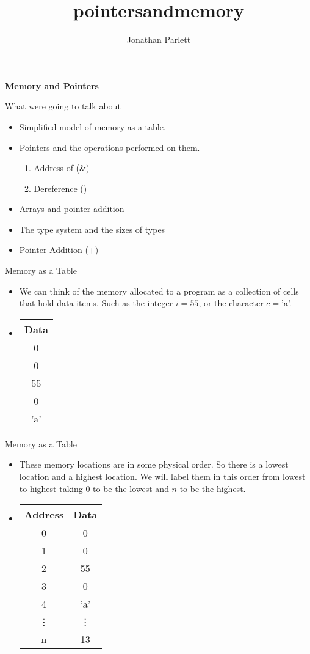 \documentclass[10pt]{beamer}
\title{pointersandmemory}
\author{Jonathan Parlett}
\begin{document}
\begin{frame}
    \titlepage
	{\bf Memory and Pointers}
\end{frame}


\begin{frame}{What were going to talk about}
	\begin{itemize}[<+->]
		\item Simplified model of memory as a table.
		\item Pointers and the operations performed on them.
		\begin{enumerate}[<+->]
			\item Address of (\&)
			\item Dereference (\*)
		\end{enumerate}
		\item Arrays and pointer addition
		\item The type system and the sizes of types
		\item Pointer Addition (+)
	\end{itemize}
\end{frame}

\begin{frame}{Memory as a Table}
\begin{itemize}[<+->]
	\item We can think of the memory allocated to a program as a collection of cells that hold data items. Such as the integer $i = 55$, or the character $c =$'a'.
	\item 
	\begin{tabular}{|c|}
		\hline
		Data\\
		\hline
		0\\
		\hline
		0\\
		\hline
		55\\
		\hline
		0\\
		\hline
		'a'\\
		\hline
	\end{tabular}
\end{itemize}
\end{frame}

\begin{frame}{Memory as a Table}
\begin{itemize}[<+->]
	\item These memory locations are in some physical order. So there is a lowest location and a highest location. We will label them in this order from lowest to highest taking 0 to be the lowest and $n$ to be the highest.
	\item 
	\begin{tabular}{|c|c|}
		\hline
		Address & Data\\
		\hline
		0 &	0\\
		\hline
		1 &	0\\
		\hline
		2 & 55\\
		\hline
		3 & 0\\
		\hline
		4 & 'a'\\
		\hline
		\vdots & \vdots \\
		\hline
		n & 13\\
		\hline
	\end{tabular}
\end{itemize}
\end{frame}
\end{document}
